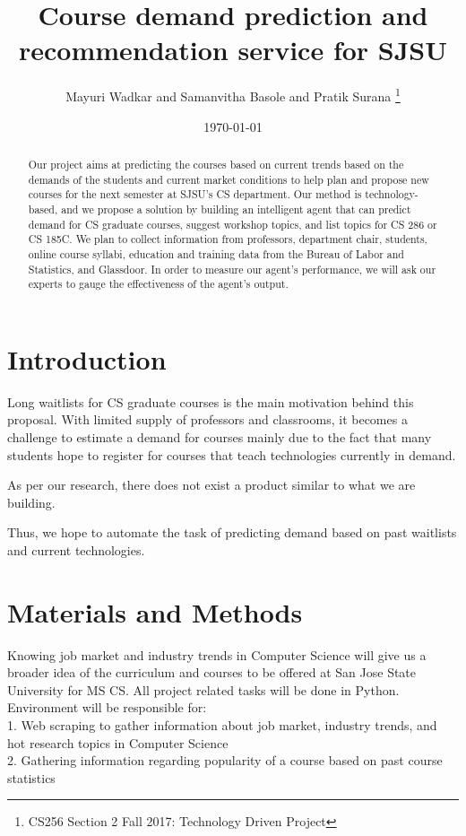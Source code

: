 \documentclass{article}
\title{Course demand prediction and recommendation service for SJSU}
\author{Mayuri Wadkar and Samanvitha Basole and Pratik Surana
\thanks{CS256 Section 2 Fall 2017: Technology Driven Project}}
\date{\today}
\begin{document}
\maketitle
\begin{abstract}
Our project aims at predicting the courses based on current trends based on the demands of the students and current market conditions to help plan and propose new courses for the next semester at SJSU's CS department. Our method is technology-based, and we propose a solution by building an intelligent agent that can predict demand for CS graduate courses, suggest workshop topics, and list topics for CS 286 or CS 185C. We plan to collect information from professors, department chair, students, online course syllabi, education and training data from the Bureau of Labor and Statistics, and Glassdoor. In order to measure our agent's performance, we will ask our experts to gauge the effectiveness of the agent's output. 
\end{abstract}

\section{Introduction}

Long waitlists for CS graduate courses is the main motivation behind this proposal. With limited supply of professors and classrooms, it becomes a challenge to estimate a demand for courses mainly due to the fact that many students hope to register for courses that teach technologies currently in demand. 

As per our research, there does not exist a product similar to what we are building. 

Thus, we hope to automate the task of predicting demand based on past waitlists and current technologies. 


\section{Materials and Methods}
Knowing job market and industry trends in Computer Science will give us a broader idea of the curriculum and courses to be offered at San Jose State University for MS CS. All project related tasks will be done in Python. \\
Environment will be responsible for: \\
1. Web scraping to gather information about job market, industry trends, and hot research topics in Computer Science \cite{mitchell2015web}\\
2. Gathering information regarding popularity of a course based on past course statistics \cite{robert2009introduction} \\
\end{document}
